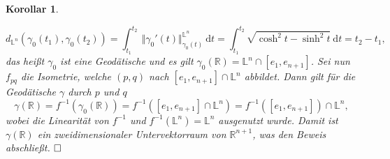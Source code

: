 \documentclass[11pt]{book}
\numberwithin{dummy}{section}
\newtheorem{corollary}[theorem]{Korollar}
\theoremstyle{nonumberbreak}
\newenvironment{pr}[1][]{\ifthenelse{\equal{#1}{}}{\proof}{\proof[#1]}\rm}{\endproof}
\newcommand{\Loid}{\mathbb{L}}
\newcommand{\R}{\mathbb{R}}
\begin{document}
\begin{spacing}{1.4}
\begin{corollary}
\begin{pr}
\begin{compactenum}
$$d_{\Loid^n}(\gamma_0(t_1), \gamma_0(t_2)) = \int_{t_1}^{t_2} \ \Vert \gamma_0'(t)\Vert_{\gamma_0(t)}^{\Loid^n} \ \mathrm{d}t = \int_{t_1}^{t_2} \sqrt{ \cosh^2t - \sinh^2t} \ \mathrm{d}t = t_2 - t_1,$$
das heißt $\gamma_0$ ist eine Geodätische und es gilt $\gamma_0(\R) = \Loid^n \cap [e_1, e_{n+1}]$. Sei nun $f_{pq}$ die Isometrie, welche $(p,q)$ nach $[e_1, e_{n+1}] \cap \Loid^n$ abbildet. Dann gilt für die Geodätische $\gamma$ durch $p$ und $q$
$$\gamma(\R) = f^{-1}(\gamma_0(\R)) = f^{-1}([e_1, e_{n+1}] \cap \Loid^n) = f^{-1}([e_1, e_{n+1}]) \cap \Loid^n,$$
wobei die Linearität von $f^{-1}$ und $f^{-1}(\Loid^n) = \Loid^n$ ausgenutzt wurde. Damit ist $\gamma(\R)$ ein zweidimensionaler Untervektorraum von $\R^{n+1}$, was den Beweis abschließt. $\hfill \Box$ 


\end{compactenum}
\end{pr}

\end{corollary}













\newpage
\thispagestyle{empty}





































































\end{spacing}
\end{document}
